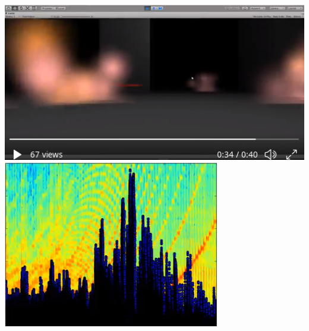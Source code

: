 \documentclass[../resume.tex]{subfiles}
\begin{document}
\noindent
\href{https://twitter.com/randompast/status/937884584150294528}{\includegraphics[scale=0.445]{../fun/ld40_3hr.png}}
\href{https://twitter.com/randompast/status/1128083994506035200}{\includegraphics[scale=0.425]{../fun/all.png}}
\end{document}
